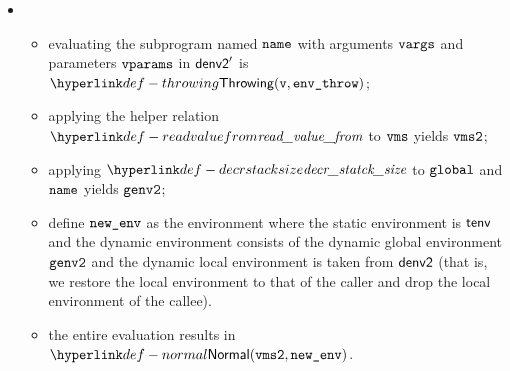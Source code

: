 \begin{itemize}
\begin{itemize}
    \item {}
    \begin{itemize}
      \item evaluating the subprogram named $\name$ with arguments $\vvargs$ and parameters $\vvparams$ in
            $\denvtwo'$ is $\Throwing(\vv, \envthrow)$\ProseOrError;
      \item applying the helper relation $\readvaluefrom$ to $\vms$ yields $\vmstwo$;
      \item applying $\decrstacksize$ to $\vglobal$ and $\name$ yields $\genvtwo$;
      \item define $\newenv$ as the environment where the static environment is $\tenv$ and the dynamic environment consists
            of the dynamic global environment $\genvtwo$ and the dynamic local environment is taken from $\denvtwo$
            (that is, we restore the local environment to that of the caller and drop the local environment of the callee).
      \item the entire evaluation results in $\Normal(\vmstwo, \newenv)$.
    \end{itemize}
  \end{itemize}
\end{itemize}

\FormallyParagraph
\begin{mathpar}
\end{mathpar}

